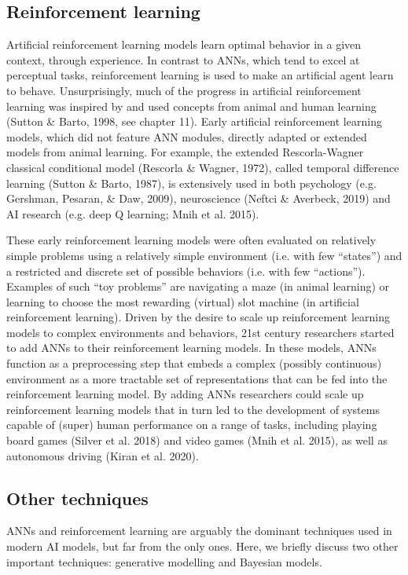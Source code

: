 \subsection{Reinforcement learning}

Artificial reinforcement learning models learn optimal behavior
in a given context, through experience.
In contrast to ANNs, which tend to excel at perceptual tasks,
reinforcement learning is used to make an artificial agent learn
to behave.
Unsurprisingly, much of the progress in artificial reinforcement
learning was inspired by and used concepts from animal and human
learning (Sutton \& Barto, 1998, see chapter 11).
Early artificial reinforcement learning models, which did not feature
ANN modules, directly adapted or extended models from animal learning.
For example, the extended Rescorla-Wagner classical conditional model
(Rescorla \& Wagner, 1972), called temporal difference learning
(Sutton \& Barto, 1987), is extensively used in both psychology
(e.g. Gershman, Pesaran, \& Daw, 2009), neuroscience
(Neftci \& Averbeck, 2019) and AI research
(e.g. deep Q learning; Mnih et al. 2015).

These early reinforcement learning models were often evaluated
on relatively simple problems using a relatively simple environment
(i.e. with few ``states'') and a restricted and discrete set of possible
behaviors (i.e. with few ``actions'').
Examples of such ``toy problems'' are navigating a maze (in animal
learning) or learning to choose the most rewarding (virtual) slot
machine (in artificial reinforcement learning).
Driven by the desire to scale up reinforcement learning models
to complex environments and behaviors, 21st century researchers
started to add ANNs to their reinforcement learning models.
In these models, ANNs function as a preprocessing step that embeds
a complex (possibly continuous) environment as a more tractable set
of representations that can be fed into the reinforcement learning
model.
By adding ANNs researchers could scale up reinforcement learning
models that in turn led to the development of systems capable of
(super) human performance on a range of tasks, including playing
board games (Silver et al. 2018) and video games (Mnih et al. 2015),
as well as autonomous driving (Kiran et al. 2020).

\subsection{Other techniques}

ANNs and reinforcement learning are arguably the dominant techniques
used in modern AI models, but far from the only ones.
Here, we briefly discuss two other important techniques:
generative modelling and Bayesian models.

